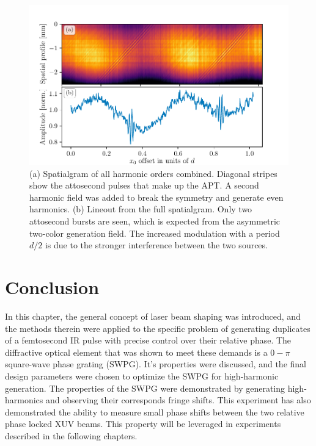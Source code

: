\begin{figure}
	\centering
	\includegraphics[width=1.0\textwidth]{figures/Two_source/full_spatialgram_w2w.pdf}
	\caption[Spatialgram of all harmonic orders combined when generated using two-color HHG]{(a) Spatialgram of all harmonic orders combined. Diagonal stripes show the attosecond pulses that make up the APT. A second harmonic field was added to break the symmetry and generate even harmonics. (b) Lineout from the full spatialgram.  Only two attosecond bursts are seen, which is expected from the asymmetric two-color generation field.  The increased modulation with a period $d/2$ is due to the stronger interference between the two sources.}
	\label{fig:full_spatialgram_w2w}
\end{figure}

\section{Conclusion}
In this chapter, the general concept of laser beam shaping was introduced, and the methods therein were applied to the specific problem of generating duplicates of a femtosecond IR pulse with precise control over their relative phase. The diffractive optical element that was shown to meet these demands is a $0-\pi$ square-wave phase grating (SWPG).  It's properties were discussed, and the final design parameters were chosen to optimize the SWPG for high-harmonic generation.  The properties of the SWPG were demonstrated by  generating high-harmonics and observing their corresponds fringe shifts.  This experiment has also demonstrated the ability to measure small phase shifts between the two relative phase locked XUV beams.  This property will be leveraged in experiments described in the following chapters.


